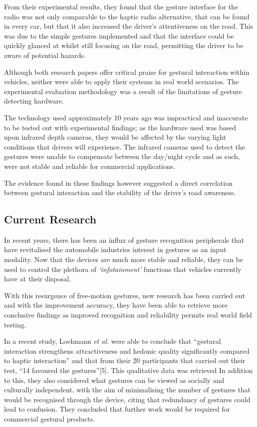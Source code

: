 \documentclass{l4proj}
\begin{document}
From their experimental results, they found that the gesture interface for the radio was not only comparable to the haptic radio alternative, that can be found in every car, but that it also increased the driver's attentiveness on the road. This was due to the simple gestures implemented and that the interface could be quickly glanced at whilst still focusing on the road, permitting the driver to be aware of potential hazards.

Although both research papers offer critical praise for gestural interaction within vehicles, neither were able to apply their systems in real world scenarios. The experimental evaluation methodology was a result of the limitations of gesture detecting hardware. 

The technology used approximately 10 years ago was impractical and inaccurate to be tested out with experimental findings; as the hardware used was based upon infrared depth cameras, they would be affected by the varying light conditions that drivers will experience. The infrared cameras used to detect the gestures were unable to compensate between the day/night cycle and as such, were not stable and reliable for commercial applications. 

The evidence found in these findings however suggested a direct correlation between gestural interaction and the stability of the driver's road awareness.

\subsection{Current Research}
\vspace{-3mm}
In recent years, there has been an influx of gesture recognition peripherals that have revitalised the automobile industries interest in gestures as an input modality. Now that the devices are much more stable and reliable, they can be used to control the plethora of {\it`infotainment'} functions that vehicles currently have at their disposal. 

With this resurgence of free-motion gestures, new research has been carried out and with the improvement accuracy, they have been able to retrieve more conclusive findings as improved recognition and reliability permits real world field testing. 

In a recent study, Loehmann \textit{et al.} \cite{} were able to conclude that ``gestural interaction strengthens attractiveness and hedonic quality significantly compared to haptic interaction'' and that from their 20 participants that carried out their test, ``14 favoured the gestures''[5]. This qualitative data was retrieved 
In addition to this, they also considered what gestures can be viewed as socially and culturally independent, with the aim of minimalising the number of gestures that would be recognised through the device, citing that redundancy of gestures could lead to confusion. They concluded that further work would be required for commercial gestural products. 
\end{document}
